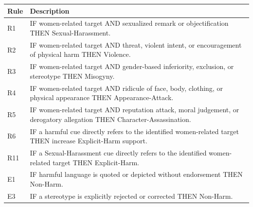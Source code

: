 \begin{tabularx}{\columnwidth}{@{}lX@{}}
\toprule
\textbf{Rule} & \textbf{Description} \\
\midrule
R1 & IF women-related target AND sexualized remark or objectification THEN Sexual-Harassment. \\
R2 & IF women-related target AND threat, violent intent, or encouragement of physical harm THEN Violence. \\
R3 & IF women-related target AND gender-based inferiority, exclusion, or stereotype THEN Misogyny. \\
R4 & IF women-related target AND ridicule of face, body, clothing, or physical appearance THEN Appearance-Attack. \\
R5 & IF women-related target AND reputation attack, moral judgement, or derogatory allegation THEN Character-Assassination. \\
R6 & IF a harmful cue directly refers to the identified women-related target THEN increase Explicit-Harm support. \\
R11 & IF a Sexual-Harassment cue directly refers to the identified women-related target THEN Explicit-Harm. \\
E1 & IF harmful language is quoted or depicted without endorsement THEN Non-Harm. \\
E3 & IF a stereotype is explicitly rejected or corrected THEN Non-Harm. \\
\bottomrule
\end{tabularx}
